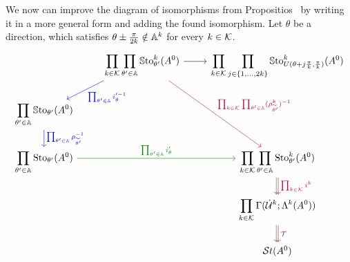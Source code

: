 \begin{prop}
  We now can improve the diagram of isomorphisms from
  Propositios~\label{prop:decompositionDiagram} by writing it in a more general
  form and adding the found isomorphism.
  Let $\theta$ be a direction, which satisfies
  $\theta\pm\frac{\pi}{2k}\notin\mathbb{A}^k$ for every $k\in\mathcal{K}$.
  \[ \begin{tikzcd}
      &\displaystyle\prod_{k\in\cK}\prod_{\theta'\in\A}\SSto_{\theta'}^{k}(A^0)
       \arrow[dl,blue,"\prod_{\theta'\in\A}i_\theta'^{-1}"]
       \arrow[ddr,purple,
         "\prod_{k\in\cK}\prod_{\theta'\in\A}(\rho_{\tilde\theta'}^k)^{-1}"]
       \arrow[r]
      &\displaystyle\prod_{k\in\cK} \prod_{j\in\{1,\dots,2k\}}
       \SSto_{U(\theta+j\frac{\pi}{k},\frac{\pi}{k})}^k(A^0)
    \\ \displaystyle\prod_{\theta'\in\A} \SSto_{\theta'}(A^0)
        \dar[blue]{\prod_{\theta'\in\A}\rho_{\tilde\theta'}^{-1}}
    \\\displaystyle\prod_{\theta'\in\A} \Sto_{\theta'}(A^0)
      \arrow[rr,green!50!black,"\prod_{\theta'\in\A}i_\theta'"]
      &&\displaystyle\prod_{k\in\cK}\prod_{\theta'\in\A}\Sto_{\theta'}^{k}(A^0)
      \dar[xshift=-1pt,green!50!black]
      \dar[xshift=1pt,purple]{\prod_{k\in\cK}i^k}
    \\
      && \displaystyle\prod_{k\in\cK}\Gamma(\dot\cU^k;\Lambda^k(A^0))
      \dar[xshift=-1pt,green!50!black]
      \dar[xshift=1pt,purple]{\cT}
    \\&& \St(A^0)
  \end{tikzcd} \]
\end{prop}

\PROBLEM{}
